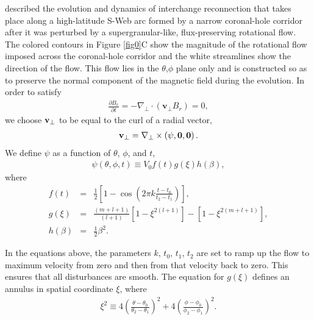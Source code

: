 \documentclass[preprint]{aastex62}
\begin{document}
 described the evolution and dynamics
of interchange reconnection that takes place along a high-latitude
S-Web arc formed by a narrow coronal-hole corridor after it was
perturbed by a supergranular-like, flux-preserving rotational flow. The colored contours 
in Figure \ref{fig0}C show the magnitude of the rotational flow imposed across the coronal-hole corridor 
and the white streamlines show the direction of the flow. This flow lies in the $\theta$,$\phi$ plane only and is 
constructed so as to preserve the normal component of the magnetic field 
during the evolution. In order to satisfy 
\begin{eqnarray}
\label{FlowInductionEqn}
\frac{\partial B_r}{\partial t} = - \nabla_\perp \cdot \left( \mathbf{v_{\perp}} B_r \right) = 0,
\end{eqnarray}
\noindent
we choose $\bf{v_\perp}$ to be equal to the curl of a radial vector, 
\begin{eqnarray}
\label{CurlVector}
\bf{v_\perp} = \nabla_\perp \times \left( \psi, 0, 0 \right).
\end{eqnarray}
\noindent We define $\psi$ as a function of $\theta$, $\phi$, and $t$, 
\begin{eqnarray}
\label{psi}
\psi \left( \theta, \phi, t \right) \equiv V_0 f(t) g(\xi) h(\beta),
\end{eqnarray}
\noindent
where 
\begin{eqnarray}
\label{ComponentsOfPsi}
f(t) &=& \frac{1}{2} \left[ 1 - \cos \left( 2 \pi k \frac{t-t_0}{t_2 - t_1} \right) \right], \\
g(\xi) &=& \frac{(m + l + 1)}{(l+1)} \left[1-\xi^{2(l+1)} \right] - \left[ 1 - \xi^{2(m+l+1)}\right],
\\
h(\beta) &=& \frac{1}{2}\beta^2.
\end{eqnarray}

\noindent In the equations above, the parameters $k$, $t_0$, $t_1$, $t_2$ are set 
to ramp up the flow to maximum velocity from zero and then from that 
velocity back to zero. This ensures that all disturbances are smooth. 
The equation for $g(\xi)$ defines an annulus in spatial coordinate 
$\xi$, where
\begin{eqnarray}
\xi^{2} \equiv 4 \left( \frac{\theta - \theta_{0}}{\theta_{2} - \theta_{1}} \right) ^{2} + 4 
\left( \frac{\phi - \phi_{0}}{\phi_{2} - \phi_{1}} \right) ^{2}.
\end{eqnarray} 
\end{document}
